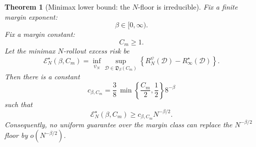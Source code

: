 \documentclass{article} %
\newtheorem{theorem}{Theorem}
\providecommand{\D}{\mathcal{D}}
\providecommand{\Risk}{R}
\begin{document}
\begin{theorem}[Minimax lower bound: the \(N\)-floor is irreducible]
\label{thm:minimax}
Fix a finite margin exponent:
\begin{equation}
\label{eq:thm3-beta}
\beta\in[0,\infty).
\end{equation}
Fix a margin constant:
\begin{equation}
\label{eq:thm3-Cm}
C_m\ge 1.
\end{equation}
Let the minimax \(N\)-rollout excess risk be
\begin{equation}
\label{eq:thm3-minimax-risk}
\mathcal E_N^\star(\beta,C_m)
=
\inf_{\psi_N}
\sup_{\D\in\mathfrak D_\beta(C_m)}
\left\{
\Risk_N^\psi(\D)-\Risk_\infty^\star(\D)
\right\}.
\end{equation}
Then there is a constant
\begin{equation}
\label{eq:thm3-constant}
c_{\beta,C_m}
=
\frac{3}{8}\,
\min\!\left\{\frac{C_m}{2},\frac12\right\}
8^{-\beta}
\end{equation}
such that
\begin{equation}
\label{eq:thm3-bound}
\mathcal E_N^\star(\beta,C_m)
\ge
c_{\beta,C_m}N^{-\beta/2}.
\end{equation}
Consequently, no uniform guarantee over the margin class can replace the
\(N^{-\beta/2}\) floor by \(o(N^{-\beta/2})\).
\end{theorem}
\end{document}
